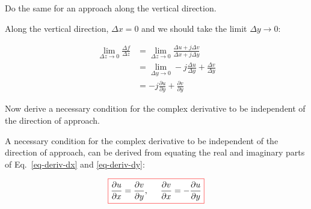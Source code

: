 \begin{cue}
Do the same for an approach along the vertical direction.
\end{cue}

Along the vertical direction, $\Delta x = 0$ and we should take the limit $\Delta y \to 0$:

\begin{align}
\lim_{\Delta z \to 0} \frac{\Delta f}{\Delta z}
& = \lim_{\Delta z \to 0} \frac{\Delta u + j \Delta v}{\Delta x + j \Delta y}
\nonumber \\
& = \lim_{\Delta y \to 0} -j\frac{\Delta u}{\Delta y} +  \frac{\Delta v}{\Delta
y} \nonumber \\
& = -j\frac{\partial u}{\partial y} +  \frac{\partial v}{\partial
y}\label{eq-deriv-dy}
\end{align}

\begin{cue}
Now derive a necessary condition for the complex derivative to be independent of the direction of approach.
\end{cue}

A necessary condition for the complex derivative to be independent of the direction of approach, can be derived from equating the real and imaginary parts of Eq.~\ref{eq-deriv-dx} and \ref{eq-deriv-dy}:

\begin{equation}
\fbox{$\displaystyle
\frac{\partial u}{\partial x} = \frac{\partial v}{\partial y}, \hspace{.5cm}
\frac{\partial v}{\partial x} = -\frac{\partial u}{\partial y}
\label{eq-Cauchy-Riemann}
$}
\end{equation} 

